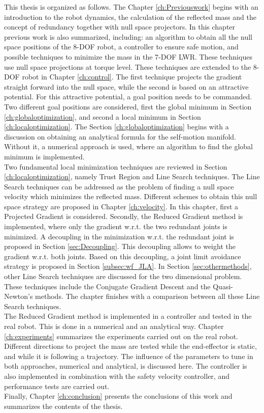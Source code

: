This thesis is organized as follows. The Chapter \ref{ch:Previouswork} begins with an introduction to the robot dynamics, the calculation of the reflected mass and the concept of redundancy together with null space projectors. In this chapter previous work is also summarized, including: an algorithm to obtain all the null space positions of the 8-DOF robot, a controller to ensure safe motion, and possible techniques to minimize the mass in the 7-DOF LWR. These techniques use null space projections at torque level.  These techniques are extended  to the 8-DOF robot in  Chapter \ref{ch:control}. The first technique projects the gradient straight forward into the null space, while the second is based on an attractive potential.  For this attractive potential, a goal position needs to be commanded. Two different goal positions are considered, first the global minimum in Section \ref{ch:globaloptimization}, and second a local minimum  in Section \ref{ch:localoptimization}. The Section  \ref{ch:globaloptimization} begins with a discussion on obtaining an analytical formula for the self-motion manifold. Without it, a numerical approach is used, where an algorithm to find the global minimum is implemented. \\
Two fundamental local minimization techniques are reviewed in Section \ref{ch:localoptimization}, namely Trust Region  and Line Search techniques. The Line Search techniques can be addressed as the problem of finding a null space velocity which minimizes the reflected mass. Different schemes to obtain this null space strategy are proposed in Chapter \ref{ch:velocity}. In this chapter, first a Projected Gradient is considered. %
Secondly, the Reduced Gradient method is implemented, where only the gradient w.r.t.  the two redundant joints is minimized. A decoupling in the minimization w.r.t. the redundant joint is proposed in Section \ref{sec:Decoupling}. This decoupling allows to weight the gradient w.r.t. both joints. Based on this decoupling, a joint limit avoidance strategy is proposed in Section \ref{subsec:wf_JLA}.
In Section \ref{sec:othermethods}, other Line Search techniques are discussed for the two dimensional problem. These techniques include the Conjugate Gradient Descent and the Quasi-Newton's methods. The chapter finishes with a comparison between all these Line Search techniques.\\
The Reduced Gradient method is implemented in a controller and tested in the real robot. This is done in a numerical and an analytical way. Chapter \ref{ch:experiments} summarizes the experiments carried out on the real robot. Different directions to project the mass are tested while the end-effector is static, and while it is following a trajectory. The influence of the parameters to tune in both approaches, numerical and analytical, is discussed here.  The controller is also implemented in combination with the safety velocity controller, and performance tests are carried out. \\
Finally, Chapter \ref{ch:conclusion} presents the conclusions of this work and summarizes the contents of the thesis.




